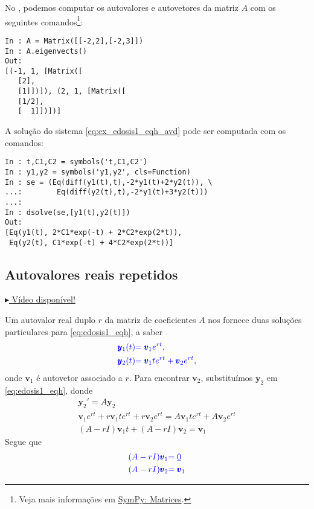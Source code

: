 \begin{ex}
\ifispython
No \python, podemos computar os autovalores e autovetores da matriz $A$ com os seguintes comandos\footnote{Veja mais informações em \href{https://docs.sympy.org/latest/tutorial/matrices.html}{SymPy: Matrices}.}:
\begin{verbatim}
In : A = Matrix([[-2,2],[-2,3]])
In : A.eigenvects()
Out: 
[(-1, 1, [Matrix([
   [2],
   [1]])]), (2, 1, [Matrix([
   [1/2],
   [  1]])])]
\end{verbatim}

A solução do sistema \eqref{eq:ex_edosis1_eqh_avd} pode ser computada com os comandos:
\begin{verbatim}
In : t,C1,C2 = symbols('t,C1,C2')
In : y1,y2 = symbols('y1,y2', cls=Function)
In : se = (Eq(diff(y1(t),t),-2*y1(t)+2*y2(t)), \
...:        Eq(diff(y2(t),t),-2*y1(t)+3*y2(t)))
...: 
In : dsolve(se,[y1(t),y2(t)])
Out: 
[Eq(y1(t), 2*C1*exp(-t) + 2*C2*exp(2*t)),
 Eq(y2(t), C1*exp(-t) + 4*C2*exp(2*t))]
\end{verbatim}
\fi
\end{ex}

\subsection{Autovalores reais repetidos}\label{subsec:edosis1_eqh_avr}

\begin{flushright}
  \href{https://archive.org/details/sistema-edos-autovalres-repetidos}{$\blacktriangleright$ Vídeo disponível!}
\end{flushright}

Um autovalor real duplo $r$ da matriz de coeficientes $A$ nos fornece duas soluções particulares para \eqref{eq:edosis1_eqh}, a saber
\begin{align}
  {\color{blue}\pmb{y}_1(t)} &{\color{blue}= \pmb{v}_1e^{rt}},\\
  {\color{blue}\pmb{y}_2(t)} &{\color{blue}= \pmb{v}_1te^{rt} + \pmb{v}_2e^{rt}},
\end{align}
onde $\pmb{v}_1$ é autovetor associado a $r$. Para encontrar $\pmb{v}_2$, substituímos $\pmb{y}_2$ em \eqref{eq:edosis1_eqh}, donde
\begin{gather}
  \pmb{y}_2' = A\pmb{y}_2 \\
  \pmb{v}_1e^{rt} + r\pmb{v}_1te^{rt} + r\pmb{v}_2e^{rt} = A\pmb{v}_1te^{rt} + A\pmb{v}_2e^{rt} \\
  (A-rI)\pmb{v}_1t + (A-rI)\pmb{v}_2 = \pmb{v}_1
\end{gather}
Segue que
\begin{align}
  {\color{blue}(A-rI)\pmb{v}_1} &{\color{blue}= \underline{0}} \\
  {\color{blue}(A-rI)\pmb{v}_2} &{\color{blue}= \pmb{v}_1}
\end{align}

